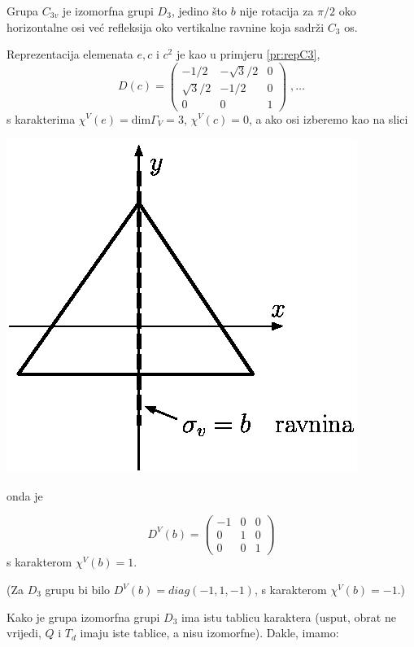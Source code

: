 \begin{primjer}

Grupa $C_{3v}$ je izomorfna grupi $D_3$, jedino što $b$ nije rotacija
za $\pi/2$ oko horizontalne osi već refleksija oko vertikalne ravnine
koja sadrži $C_3$ os.

Reprezentacija elemenata $e, c$ i  $c^2$ je kao u primjeru \ref{pr:repC3},
\begin{displaymath}
D(c)=
\left(
\begin{array}{ccc}
-1/2 & -\sqrt{3}/2 & 0 \\
\sqrt{3}/2 & -1/2 & 0 \\
0 & 0 & 1
\end{array}\right) \;, \ldots
\end{displaymath}
s karakterima $\chi^{V}(e)=\mbox{dim}\Gamma_{V}=3$, $\chi^{V}(c)=0$,
a ako osi izberemo kao na slici
\centerline{\includegraphics[scale=0.8]{pics/C3vravnina.eps}}
onda je 

\begin{displaymath}
D^{V}(b)=
\left(
\begin{array}{ccc}
-1 & 0 & 0 \\
0 & 1 & 0 \\
0 & 0 & 1
\end{array}\right) 
\end{displaymath}
s karakterom $\chi^{V}(b)=1$.

(Za $D_3$  grupu bi bilo $D^{V}(b)=diag(-1, 1, -1)$, s karakterom
$\chi^{V}(b)=-1$.)

Kako je grupa izomorfna grupi $D_3$ ima istu tablicu karaktera (usput, obrat
ne vrijedi, $Q$ i $T_d$ imaju iste tablice, a nisu izomorfne). Dakle,
imamo:


\end{primjer}
